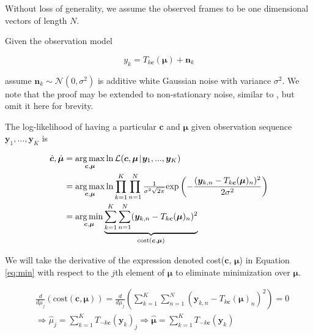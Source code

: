 \documentclass{article}
\newcommand\lpipe{\mkern1.5mu{|}\mkern1.5mu}
\DeclareMathOperator*{\argmin}{\arg\min}
\DeclareMathOperator*{\argmax}{\arg\max}
\begin{document}
Without loss of generality, we assume the observed frames to be one dimensional vectors of length $N$.

Given the observation model

\begin{equation*}
y_k = T_{k\bm{c}}(\bm{\mu}) + \bm{n}_k
\end{equation*}

assume $\bm{n}_k \sim \mathcal{N}(0, \sigma^2)$ is additive white Gaussian noise with variance $\sigma^2$.  We note that the proof may be extended to non-stationary noise, similar to \cite{gratadour2005sub}, but omit it here for brevity.


The log-likelihood of having a particular $\bm{c}$ and $\bm{\mu}$ given observation sequence $\bm{y}_1, ..., \bm{y}_K$ is


\begin{align}
  \hat{\bm{c}}, \hat{\bm{\mu}} &= \argmax_{\bm{c}, \bm{\mu}} \ln \mathcal{L}(\bm{c}, \bm{\mu} \lpipe \bm{y}_1, ..., \bm{y}_K) \nonumber \\
  &=\argmax_{\bm{c}, \bm{\mu}} \ln \prod_{k=1}^K \prod_{n=1}^N \tfrac{1}{\sigma^2 \sqrt{2 \pi}} \text{exp} \left(- \frac{(\bm{y}_{k,n} - T_{k\bm{c}}(\bm{\mu})_n)^2}{2\sigma^2}\right) \nonumber \\
  &=\argmin_{\bm{c}, \bm{\mu}} \underbrace{\sum_{k=1}^K \sum_{n=1}^N (\bm{y}_{k,n} - T_{k\bm{c}}(\bm{\mu})_n)^2}_{\text{cost}(\bm{c}, \bm{\mu})} \label{eq:min}
\end{align}

We will take the derivative of the expression denoted cost($\bm{c}$, $\bm{\mu}$) in Equation \ref{eq:min} with respect to the $j$th element of $\bm{\mu}$ to eliminate minimization over $\bm{\mu}$.


\begin{align}
  &\frac{d}{d\mu_j}\left(\text{cost}(\bm{c}, \bm{\mu})\right)
  =\frac{d}{d\mu_j}\left(\sum_{k=1}^K \sum_{n=1}^N (\bm{y}_{k,n} - T_{k\bm{c}}(\bm{\mu})_n)^2\right) = 0 \nonumber  \\
  &\Longrightarrow \hat{\mu}_j = \sum_{k=1}^K T_{-k\bm{c}}(\bm{y}_k)_j
  \Longrightarrow \hat{\bm{\mu}} = \sum_{k=1}^K T_{-k\bm{c}}(\bm{y}_k) \label{eq:mu}
\end{align}
\end{document}
